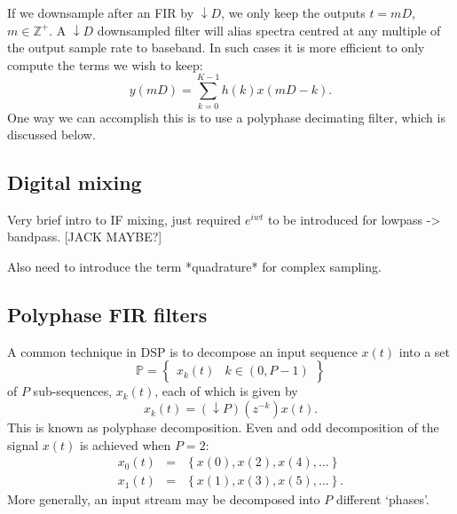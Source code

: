 \documentclass{ws-rv961x669}
\begin{document}
If we downsample after an FIR by $\downarrow D$, we only keep the outputs $t=mD$, $m\in\mathbb{Z}^{+}$. A $\downarrow D$ downsampled filter will alias spectra centred at any multiple of the output sample rate to baseband. In such cases it is more efficient to only compute the terms we wish to keep: 
\begin{equation}
y(mD)=\sum_{k=0}^{K-1}h(k)x(mD-k).\label{eq:FIR-filter-decimated}
\end{equation}
One way we can accomplish this is to use a polyphase decimating filter, which is discussed below. 

\subsection{Digital mixing}

Very brief intro to IF mixing, just required $e^{i w t}$ to be introduced for lowpass -> bandpass. [JACK MAYBE?]

Also need to introduce the term *quadrature* for complex sampling.

\subsection{Polyphase FIR filters}

A common technique in DSP is to decompose an input sequence $x(t)$ into a set
\begin{equation}
\mathbb{P}=\begin{Bmatrix}x_{k}(t) & k\in(0,P-1)\end{Bmatrix}
\end{equation}
of $P$ sub-sequences, $x_{k}(t)$, each of which is given by 
\begin{equation}
x_{k}(t)=(\downarrow P)(z^{-k})x(t).
\end{equation}
This is known as polyphase decomposition. Even and odd decomposition
of the signal $x(t)$ is achieved when $P=\mbox{2}$:
\begin{eqnarray}
x_{0}(t) & = & \left\{ x(0),x(2),x(4),...\right\} \\
x_{1}(t) & = & \left\{ x(1),x(3),x(5),...\right\} .
\end{eqnarray}
More generally, an input stream may be decomposed into $P$ different `phases'.
\end{document}
